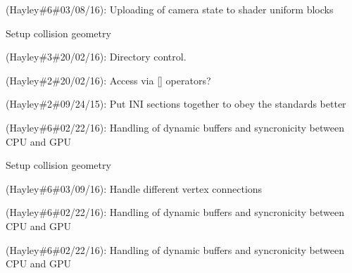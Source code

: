 
\begin{DoxyRefList}
\item[\label{todo__todo000009}%
\hypertarget{todo__todo000009}{}%
Member \hyperlink{class_camera_a05a6d1c771d22375d60cdf249fbb2492}{Camera\+:\+:apply} (\hyperlink{class_context}{Context} $\ast$context, \hyperlink{class_shader_uniform_block}{Shader\+Uniform\+Block} $\ast$buffer) const ](Hayley\#6\#03/08/16)\+: Uploading of camera state to shader uniform blocks  
\item[\label{todo__todo000001}%
\hypertarget{todo__todo000001}{}%
Class \hyperlink{class_collision_component}{Collision\+Component} ]Setup collision geometry 
\item[\label{todo__todo000004}%
\hypertarget{todo__todo000004}{}%
Class \hyperlink{class_config}{Config} ](Hayley\#3\#20/02/16)\+: Directory control. 

(Hayley\#2\#20/02/16)\+: Access via \mbox{[}\mbox{]} operators?  
\item[\label{todo__todo000003}%
\hypertarget{todo__todo000003}{}%
Member \hyperlink{class_config_a095b729166d151267aea1e969e02a5e0}{Config\+:\+:save} (const std\+::string \&file)](Hayley\#2\#09/24/15)\+: Put I\+NI sections together to obey the standards better  
\item[\label{todo__todo000006}%
\hypertarget{todo__todo000006}{}%
Class \hyperlink{class_index_buffer_object}{Index\+Buffer\+Object} ](Hayley\#6\#02/22/16)\+: Handling of dynamic buffers and syncronicity between C\+PU and G\+PU  
\item[\label{todo__todo000002}%
\hypertarget{todo__todo000002}{}%
Class \hyperlink{class_life_time_component}{Life\+Time\+Component} ]Setup collision geometry 
\item[\label{todo__todo000005}%
\hypertarget{todo__todo000005}{}%
Member \hyperlink{class_model_afb320a52ec7f8f8512eb6514cfc58848}{Model\+:\+:draw} (\hyperlink{class_context}{Context} $\ast$context, std\+::shared\+\_\+ptr$<$ Shader\+Program $>$ shader) const ](Hayley\#6\#03/09/16)\+: Handle different vertex connections  
\item[\label{todo__todo000007}%
\hypertarget{todo__todo000007}{}%
Class \hyperlink{class_vertex_buffer_object}{Vertex\+Buffer\+Object$<$ V $>$} ](Hayley\#6\#02/22/16)\+: Handling of dynamic buffers and syncronicity between C\+PU and G\+PU  
\item[\label{todo__todo000008}%
\hypertarget{todo__todo000008}{}%
Class \hyperlink{class_vertex_buffer_object_base}{Vertex\+Buffer\+Object\+Base} ](Hayley\#6\#02/22/16)\+: Handling of dynamic buffers and syncronicity between C\+PU and G\+PU 
\end{DoxyRefList}